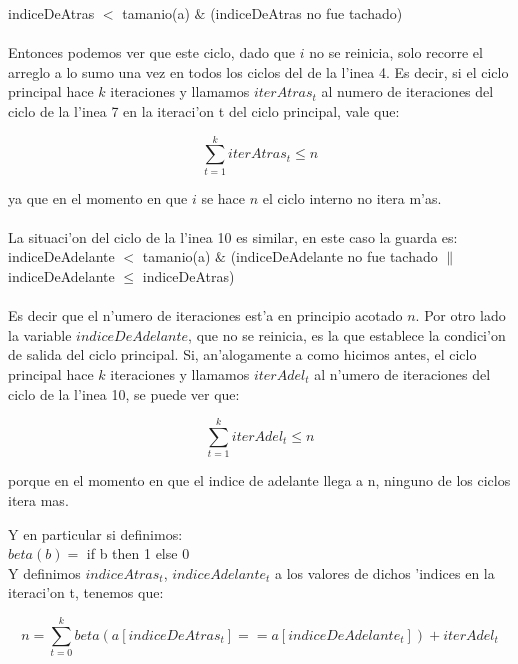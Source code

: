 indiceDeAtras $<$ tamanio(a) $\&$ (indiceDeAtras no fue tachado)\

\paragraph{}
Entonces podemos ver que este ciclo, dado que $i$ no se reinicia, solo recorre el arreglo a lo sumo una 
vez en todos los ciclos del de la l'inea 4. Es decir, si el ciclo principal hace $k$ iteraciones y llamamos 
$iterAtras_t$ al numero de iteraciones del ciclo de la l'inea 7 en la iteraci'on t del ciclo principal, vale que:

$$\sum_{t=1}^{k}iterAtras_t \leq n$$

ya que en el momento en que $i$ se hace $n$ el ciclo interno no itera m'as.
\paragraph{}
La situaci'on del ciclo de la l'inea 10 es similar, en este caso la guarda es:\\

indiceDeAdelante $<$ tamanio(a) $\&$ (indiceDeAdelante no fue tachado $\|$ indiceDeAdelante $\leq$ indiceDeAtras)

\paragraph{}
Es decir que el n'umero de iteraciones est'a en principio acotado $n$. Por otro lado la variable $indiceDeAdelante$, 
que no se reinicia, es la que establece la condici'on de salida del ciclo principal. Si, an'alogamente a como hicimos 
antes, el ciclo principal hace $k$ iteraciones y llamamos $iterAdel_t$ al n'umero de iteraciones del ciclo de 
la l'inea 10, se puede ver que:

$$\sum_{t=1}^{k}iterAdel_t \leq n$$

porque en el momento en que el indice de adelante llega a n, ninguno de los ciclos itera mas.

Y en particular si definimos:\\

$beta(b) =$ if b then 1 else 0 \\

Y definimos $indiceAtras_t$, $indiceAdelante_t$ a los valores de dichos 'indices en la iteraci'on t, tenemos que:

$$n=\sum_{t=0}^{k}beta(a[indiceDeAtras_t] == a[indiceDeAdelante_t])+ iterAdel_t$$

